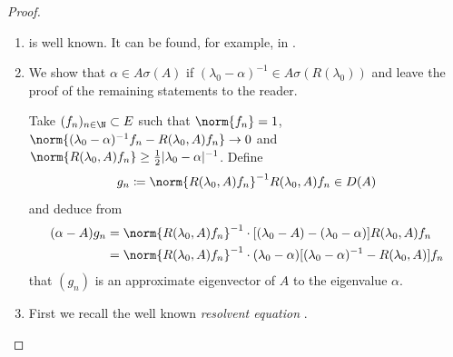 \begin{proof}
\begin{enumerate}[\upshape (i), wide, labelindent=.25em]
\item 
is well known. It can be found, for example, in \textcite[VII.9.2]{dunfordschwartz:1958}.

\item 
We show that $\alpha \in A\sigma(A)$ if\/ $(\lambda_{0}-\alpha)^{-1} \in A\sigma(R(\lambda_{0}))$ and leave the proof of the remaining statements to the reader.

Take $(f_{n})_{n \in \N} \subset E$ such that $\norm{f_{n}} = 1$, $\norm{(\lambda_{0}-\alpha)^{-1}f_{n} - R(\lambda_{0},A)f_{n}} \to 0$ and $\norm{R(\lambda_{0},A)f_{n}} \geq \frac{1}{2}|\lambda_{0} - \alpha|^{-1}$.
Define
\[
g_{n} \coloneqq \norm{R(\lambda_{0},A)f_{n}}^{-1}R(\lambda_{0},A)f_{n} \in D(A)
\]
and deduce from
\begin{align*}
(\alpha-A)g_{n} &= \norm{R(\lambda_{0},A)f_{n}}^{-1} \cdot 
		[(\lambda_{0}-A) - (\lambda_{0}-\alpha)]R(\lambda_{0},A)f_{n} \\  
	&= \norm{R(\lambda_{0},A)f_{n}}^{-1} \cdot 			(\lambda_{0}-\alpha)[(\lambda_{0}-\alpha)^{-1} - R(\lambda_{0},A)]f_{n}
\end{align*}
that $(g_{n})$ is an approximate eigenvector of\/ $A$ to the eigenvalue $\alpha$.

\item 
First we recall the well known \emph{resolvent equation}
. 


\end{enumerate}
\end{proof}
